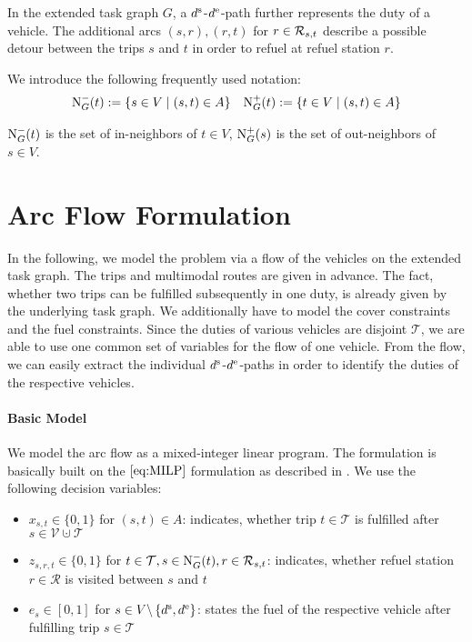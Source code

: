In the extended task graph $G$, a $d^{\operatorname{s}}$-$d^{\operatorname{e}}$-path further represents the duty of a vehicle. The additional arcs $(s,r),(r,t)$ for $r\in\mathcal{R}_{s,t}$ describe a possible detour between the trips $s$ and $t$ in order to refuel at refuel station $r$.

We introduce the following frequently used notation:
\begin{align*}
	\operatorname{N}_G^-(t) := \left\{s\in V\mid (s,t)\in A\right\} && \operatorname{N}_G^+(t) := \left\{t\in V\mid (s,t)\in A\right\}
\end{align*}

$\operatorname{N}_G^-(t)$ is the set of in-neighbors of $t\in V$, $\operatorname{N}_G^+(s)$ is the set of out-neighbors of $s\in V$.


\section{Arc Flow Formulation}
\label{sec:arcflow_formulation}

In the following, we model the problem via a flow of the vehicles on the extended task graph. The trips and multimodal routes are given in advance. The fact, whether two trips can be fulfilled subsequently in one duty, is already given by the underlying task graph. We additionally have to model the cover constraints and the fuel constraints. Since the duties of various vehicles are disjoint \wrt $\mathcal{T}$, we are able to use one common set of variables for the flow of one vehicle. From the flow, we can easily extract the individual $d^{\operatorname{s}}$-$d^{\operatorname{e}}$-paths in order to identify the duties of the respective vehicles.

\paragraph{Basic Model} \parfill

We model the arc flow as a mixed-integer linear program. The formulation is basically built on the $\eqref{eq:MILP}$ formulation as described in \cite[p. 34]{Kaiser_Knoll}. We use the following decision variables:
\begin{itemize}
	\item{$x_{s,t}\in\{0,1\}$ for $(s,t)\in A$: indicates, whether trip $t\in\mathcal{T}$ is fulfilled after ${s\in \mathcal{V}\cupdot\mathcal{T}}$}
	\item{$z_{s,r,t}\in\{0,1\}$ for $t\in\mathcal{T},s\in\operatorname{N}_G^-(t),r\in\mathcal{R}_{s,t}$: indicates, whether refuel station $r\in\mathcal{R}$ is visited between $s$ and $t$}
	\item{$e_s\in[0,1]$ for $s\in V\backslash\left\{d^{\operatorname{s}},d^{\operatorname{e}}\right\}$: states the fuel of the respective vehicle after fulfilling trip $s\in\mathcal{T}$}
\end{itemize}

